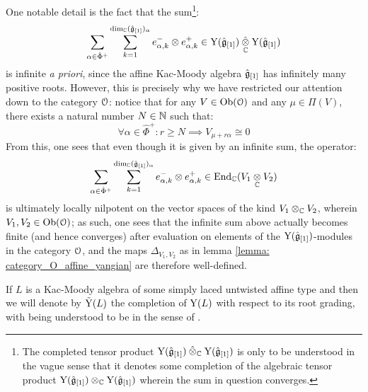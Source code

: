         \begin{remark}
            One notable detail is the fact that the sum\footnote{The completed tensor product $\rmY(\hat{\g}_{[1]}) \hattensor_{\bbC} \rmY(\hat{\g}_{[1]})$ is only to be understood in the vague sense that it denotes some completion of the algebraic tensor product $\rmY(\hat{\g}_{[1]}) \tensor_{\bbC} \rmY(\hat{\g}_{[1]})$ wherein the sum in question converges.}:
                $$\sum_{\alpha \in \hat{\Phi}^+} \sum_{k = 1}^{ \dim_{\bbC} (\hat{\g}_{[1]})_{\alpha} } e_{\alpha, k}^- \tensor e_{\alpha, k}^+ \in \rmY(\hat{\g}_{[1]}) \hattensor_{\bbC} \rmY(\hat{\g}_{[1]})$$
            is infinite \textit{a priori}, since the affine Kac-Moody algebra $\hat{\mathfrak{g}}_{[1]}$ has infinitely many positive roots. However, this is precisely why we have restricted our attention down to the category $\mathcal{O}$: notice that for any $V \in \mathrm{Ob}(\mathcal{O})$ and any $\mu \in \Pi(V)$, there exists a natural number $N \in \mathbb{N}$ such that:
                $$\forall \alpha \in \hat{\Phi}^+: r \geq N \implies V_{\mu + r \alpha} \cong 0$$
            From this, one sees that even though it is given by an infinite sum, the operator:
                $$\sum_{\alpha \in \hat{\Phi}^+} \sum_{k = 1}^{ \dim_{\bbC} (\hat{\g}_{[1]})_{\alpha} } e_{\alpha, k}^- \tensor e_{\alpha, k}^+ \in \End_{\bbC}(V_1 \tensor_{\bbC} V_2)$$
            is ultimately locally nilpotent on the vector spaces of the kind $V_1 \tensor_{\bbC} V_2$, wherein $V_1, V_2 \in \mathrm{Ob}(\mathcal{O})$; as such, one sees that the infinite sum above actually becomes finite (and hence converges) after evaluation on elements of the $\mathrm{Y}(\hat{\mathfrak{g}}_{[1]})$-modules in the category $\mathcal{O}$, and the maps $\Delta_{V_1, V_2}$ as in lemma \ref{lemma: category_O_affine_yangian} are therefore well-defined. 
        \end{remark}
        \begin{convention}
            If $L$ is a Kac-Moody algebra of some simply laced untwisted affine type and then we will denote by $\tilde{\mathrm{Y}}(L)$ the completion of $\mathrm{Y}(L)$ with respect to its root grading, with  being understood to be in the sense of \cite[Appendix A]{wendlandt_formal_shift_operators_on_yangian_doubles}.
        \end{convention}
